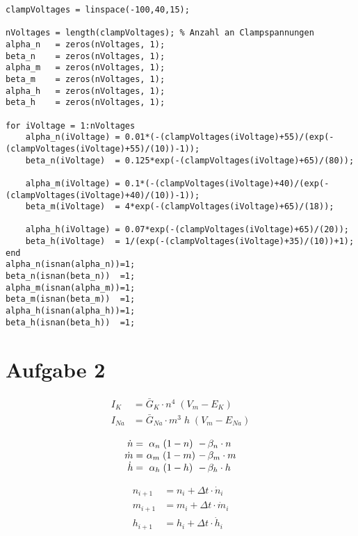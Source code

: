 \documentclass[12pt,a4paper,noendnumber=true]{scrartcl}
\begin{document}
\begin{lstlisting}
clampVoltages = linspace(-100,40,15);

nVoltages = length(clampVoltages); % Anzahl an Clampspannungen
alpha_n   = zeros(nVoltages, 1); 
beta_n    = zeros(nVoltages, 1);
alpha_m   = zeros(nVoltages, 1);
beta_m    = zeros(nVoltages, 1);
alpha_h   = zeros(nVoltages, 1);
beta_h    = zeros(nVoltages, 1);

for iVoltage = 1:nVoltages
	alpha_n(iVoltage) = 0.01*(-(clampVoltages(iVoltage)+55)/(exp(-(clampVoltages(iVoltage)+55)/(10))-1));
	beta_n(iVoltage)  = 0.125*exp(-(clampVoltages(iVoltage)+65)/(80));
	
	alpha_m(iVoltage) = 0.1*(-(clampVoltages(iVoltage)+40)/(exp(-(clampVoltages(iVoltage)+40)/(10))-1));        
	beta_m(iVoltage)  = 4*exp(-(clampVoltages(iVoltage)+65)/(18));
	
	alpha_h(iVoltage) = 0.07*exp(-(clampVoltages(iVoltage)+65)/(20));
	beta_h(iVoltage)  = 1/(exp(-(clampVoltages(iVoltage)+35)/(10))+1);
end
alpha_n(isnan(alpha_n))=1;
beta_n(isnan(beta_n))  =1;
alpha_m(isnan(alpha_m))=1;
beta_m(isnan(beta_m))  =1;
alpha_h(isnan(alpha_h))=1;
beta_h(isnan(beta_h))  =1;
\end{lstlisting}






\section{Aufgabe 2}

\begin{subequations}
	\begin{align*}
	I_K &= \bar{G}_K \cdot n^4 \; (V_m-E_K) \\
	I_{Na} &= \bar{G}_{Na} \cdot m^3 \; h \; (V_m-E_{Na}) 
	\end{align*}
\end{subequations}

\begin{equation*}
	\begin{array}{r@{\ }c@{\ }l}
	\dot{n}= & \alpha_n \; (1-n) &- \, \beta_n \cdot n \\
	\dot{m}= & \alpha_m \; (1-m) &- \, \beta_m \cdot m \\
	\dot{h}= & \alpha_h \; (1-h) &- \, \beta_h \cdot h 
	\end{array}
\end{equation*}

\begin{subequations}
	\begin{align*}
	n_{i+1} &= n_i + \Delta t \cdot \dot{n}_i \\ 
	m_{i+1} &= m_i + \Delta t \cdot \dot{m}_i \\
	h_{i+1} &= h_i + \Delta t \cdot \dot{h}_i 
	\end{align*}
\end{subequations}
\end{document}
